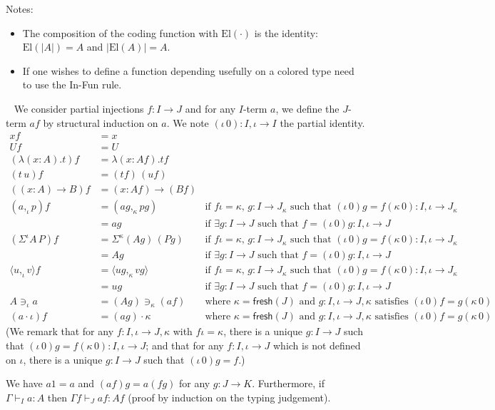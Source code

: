 \documentclass[english]{PaperTools/latex/lipics}
\newcommand\CP[3]{(#2,_{#1} #3)}
\newcommand\op[1]{∋_{#1}}
\newcommand\ip[3]{Σ^{#1} {#2}\,{#3}}
\newcommand\fp[3]{⟨#2 ,_{#1} #3⟩}
\def\fresh#1{\mathsf{fresh}(#1)}
\def\El#1{\mathrm{El}(#1)}
\begin{document}
Notes:

\begin{itemize}
  \item The composition of the coding function with $\El{·}$ is the
    identity: $\El{|A|} = A$ and $|\El{A}| = A$.
\item If one wishes to define a function depending usefully on a colored type
  need to use the {\sc In-Fun} rule.
\end{itemize}

\begin{definition}~
  We consider partial injections $f : I → J$ and for any $I$-term $a$,
  we define the $J$-term $af$ by structural induction on $a$.
  We note $(ι\,0) : I,ι → I$ the partial identity.
\begin{align*}
  x f & = x \\
  U f & = U \\
  (λ(x:A).t) f &= λ(x:Af).tf \\
  (t\,u) f &= (tf) \, (uf) \\
  ((x:A)→B) f &= (x:Af)→(Bf) \\
  \CP {ι} a p f &= \CP {κ} {ag} {pg}
    & \text{if $fι = κ$, $g : I→J_κ$ such that $(ι\,0)g = f(κ\,0) : I,ι → J_κ$} \\
                &= ag
    & \text{if $∃g : I→J$ such that $f = (ι\,0)g : I,ι → J$} \\
  (\ip {ι} A P) f &= \ip {κ} {(Ag)} {(Pg)}
    & \text{if $fι = κ$, $g : I→J_κ$ such that $(ι\,0)g = f(κ\,0) : I,ι → J_κ$} \\
                &= Ag
    & \text{if $∃g : I→J$ such that $f = (ι\,0)g : I,ι → J$} \\
  \fp {ι} u v f &= \fp {κ} {ug} {vg}
    & \text{if $fι = κ$, $g : I→J_κ$ such that $(ι\,0)g = f(κ\,0) : I,ι → J_κ$} \\
                &= ug
    & \text{if $∃g : I→J$ such that $f = (ι\,0)g : I,ι → J$} \\
  A \op {ι} a &= (Ag) \op {κ} (af)
    & \text{where $κ = \fresh J$ and $g:I,ι → J,κ$ satisfies $(ι\,0)f = g(κ\,0)$} \\
  (a · ι) f &= (ag) · κ
    & \text{where $κ = \fresh J$ and $g:I,ι → J,κ$ satisfies $(ι\,0)f = g(κ\,0)$}
\end{align*}
  (We remark that for any $f : I,ι → J,κ$ with $fι=κ$, there is a
  unique $g : I → J$ such that $(ι\,0)g = f(κ\,0) : I,ι → J$;
  and that for any $f : I,ι → J$ which is not defined on $ι$, there is
  a unique $g : I → J$ such that $(ι\,0)g = f$.)

  We have $a1 = a$ and $(af)g = a(fg)$ for any $g : J → K$.
  Furthermore, if $Γ ⊢_I a : A$ then $Γ f ⊢_J af : Af$ (proof by
  induction on the typing judgement).
\end{definition}
\end{document}
